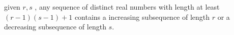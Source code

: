 \begin{problem}
    given $r, s$ , any sequence of distinct real numbers with length at least $(r-1)(s-1)+1$ contains a increasing subsequence of length $r$ or a decreasing subsequence of length $s$.
    \label{ERDOSSZEKERES}
\end{problem}